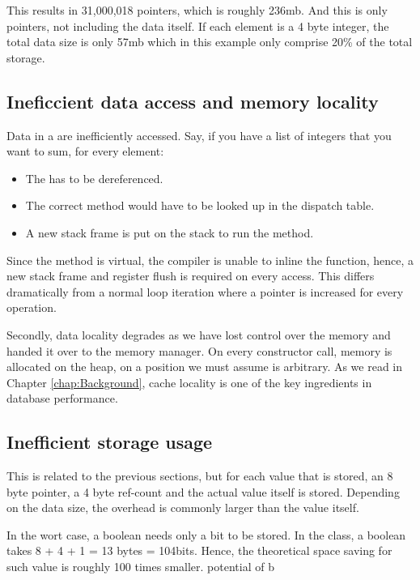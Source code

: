 This results in 31,000,018 pointers, which is roughly 236mb. And this is only pointers, not including the data itself. If each element is a 4 byte integer, the total data size is only 57mb which in this example only comprise 20\% of the total storage.

\subsection{Ineficcient data access and memory locality}
\label{sub:Ineficcient data access and memory locality}
Data in a  are inefficiently accessed. Say, if you have a list of  integers that you want to sum, for every element:
\begin{itemize}
    \item The  has to be dereferenced.
    \item The correct  method would have to be looked up in the dispatch table.
    \item A new stack frame is put on the stack to run the  method.
\end{itemize}
Since the method is virtual, the compiler is unable to inline the function, hence, a new stack frame and register flush is required on every access. This differs dramatically from a normal loop iteration where a pointer is increased for every operation.

Secondly, data locality degrades as we have lost control over the memory and handed it over to the memory manager. On every constructor call, memory is allocated on the heap, on a position we must assume is arbitrary. As we read in Chapter \ref{chap:Background}, cache locality is one of the key ingredients in database performance.

\subsection{Inefficient storage usage}
\label{sub:Inefficient storage usage}
This is related to the previous sections, but for each value that is stored, an 8 byte pointer, a 4 byte ref-count and the actual value itself is stored. Depending on the data size, the overhead is commonly larger than the value itself.

In the wort case, a boolean needs only a bit to be stored. In the  class, a boolean takes 8 + 4 + 1 = 13 bytes = 104bits. Hence, the theoretical space saving for such value is roughly 100 times smaller.
potential of b


